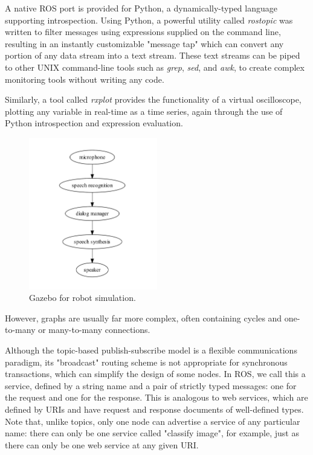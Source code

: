 A native ROS port is provided for Python, a dynamically-typed language supporting introspection. Using Python, a powerful utility called \textit{rostopic} was written to filter messages using expressions supplied on the command line, resulting in an instantly customizable "message tap" which can convert any portion of any data stream into a text stream. These text streams can be piped to other UNIX command-line tools such as \textit{grep}, \textit{sed}, and \textit{awk}, to create complex monitoring tools without writing any code.

Similarly, a tool called \textit{rxplot} provides the functionality of a virtual oscilloscope, plotting any variable in real-time as a time series, again through the use of Python introspection and expression evaluation.

\begin{figure}[h]
\centering
\includegraphics[width=0.5\textwidth]{figs/ch2/ros-pipeline}
\caption{Gazebo for robot simulation.}
\end{figure}

However, graphs are usually far more complex, often containing cycles and one-to-many or many-to-many connections.

Although the topic-based publish-subscribe model is a flexible communications paradigm, its "broadcast" routing scheme is not appropriate for synchronous transactions, which can simplify the design of some nodes. In ROS, we call this a service, defined by a string name and a pair of strictly typed messages: one for the request and one for the response. This is analogous to web services, which are defined by URIs and have request and response documents of well-defined types. Note that, unlike topics, only one node can advertise a service of any particular name: there can only be one service called "classify image", for example, just as there can only be one web service at any given URI.

